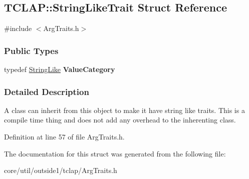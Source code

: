 \hypertarget{structTCLAP_1_1StringLikeTrait}{}\subsection{T\+C\+L\+AP\+:\+:String\+Like\+Trait Struct Reference}
\label{structTCLAP_1_1StringLikeTrait}


{\ttfamily \#include $<$Arg\+Traits.\+h$>$}

\subsubsection*{Public Types}
\begin{DoxyCompactItemize}
\item 
typedef \hyperlink{structTCLAP_1_1StringLike}{String\+Like} {\bfseries Value\+Category}\hypertarget{structTCLAP_1_1StringLikeTrait_a7a081c80b731414dcad1b50cf80b7433}{}\label{structTCLAP_1_1StringLikeTrait_a7a081c80b731414dcad1b50cf80b7433}

\end{DoxyCompactItemize}


\subsubsection{Detailed Description}
A class can inherit from this object to make it have string like traits. This is a compile time thing and does not add any overhead to the inherenting class. 

Definition at line 57 of file Arg\+Traits.\+h.



The documentation for this struct was generated from the following file\+:\begin{DoxyCompactItemize}
\item 
core/util/outside1/tclap/Arg\+Traits.\+h\end{DoxyCompactItemize}
